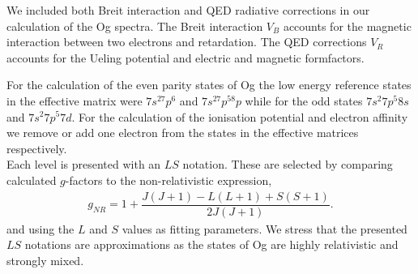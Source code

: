 \documentclass[10pt,a4paper, twoside, openright]{report}
\begin{document}
We included both Breit interaction\cite{Breit1929, Mann1971, DF2016}  and QED radiative corrections in our calculation of the Og spectra.  The Breit interaction $V_B$ accounts for the magnetic interaction between two electrons and retardation. The QED corrections $V_R$ accounts for the Ueling potential and electric and magnetic formfactors\cite{FG2005}. 

For the calculation of the even parity states of Og the low energy reference states in the effective matrix were $7s^27p^6$ and $7s^27p^58p$ while for the odd states $7s^2 7p^5 8s$ and $7s^2 7p^5 7d$. For the calculation of the ionisation potential and electron affinity we remove or add one electron from the states in the effective matrices respectively.\\
 
Each level is presented with an $LS$ notation. These are selected by comparing calculated $g$-factors to the non-relativistic expression,
\begin{align} 
g_{NR} =  1 + \dfrac{J(J + 1) - L(L+1) + S(S+1)}{2J(J+1)}.
\end{align}
and using the $L$ and $S$ values as fitting parameters. We stress that the presented $LS$ notations are approximations as the states of Og are highly relativistic and strongly mixed. \\
\fi
\end{document}
